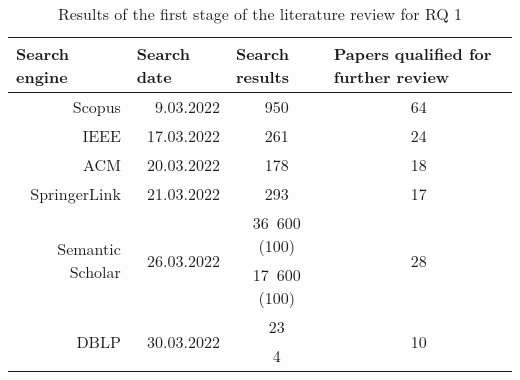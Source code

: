 \begin{table}[]
    \begin{threeparttable}[b]
        \centering
        \caption{Results of the first stage of the literature review for RQ 1}
        \begin{tabular}{@{}rrcc@{}}
            \toprule
            \multicolumn{1}{l}{\textbf{Search engine}}          & \multicolumn{1}{l}{\textbf{Search date}} & \multicolumn{1}{l}{\textbf{Search results}} & \multicolumn{1}{l}{\textbf{Papers qualified for further review}} \\
            \midrule
            Scopus                                              & 9.03.2022                                & 950                                         & 64                                                               \\
            IEEE                                                & 17.03.2022                               & 261                                         & 24                                                               \\
            ACM                                                 & 20.03.2022                               & 178                                         & 18                                                               \\
            SpringerLink                                        & 21.03.2022                               & 293                                         & 17                                                               \\
            \multirow{2}{*}{Semantic Scholar}                   & \multirow{2}{*}{26.03.2022}              & 36\ 600 (100)\tnote{1}                       & \multirow{2}{*}{28}                                              \\
                                                                &                                          & 17\ 600 (100)\tnote{2}                       &                                                                  \\
            \multirow{2}{*}{DBLP}                               & \multirow{2}{*}{30.03.2022}              & 23\tnote{1}                                 & \multirow{2}{*}{10}                                              \\
                                                                &                                          & 4\tnote{2}                                  &                                                                  \\

\end{tabular}
\end{threeparttable}
\end{table}
